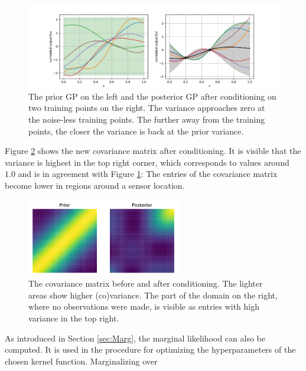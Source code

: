 \documentclass[%
  a4paper,oneside,%
  11pt,%
  smallchapters,
  style=printdev,
  extramargin,
  green,%
  rgb, <cmyk>
  ]{tubsbook}
\begin{document}
\begin{figure}[!ht]
\begin{center}

\includegraphics[width=1.1\textwidth]{pics/GPExpl}
\caption{The prior GP on the left and the posterior GP after conditioning on two training points on the right. The variance approaches zero at the noise-less training points. The further away from the training points, the closer the variance is back at the prior variance.}
\label{fig:GPExpl}

\end{center}
\end{figure}

Figure \ref{fig:CovPOst} shows the new covariance matrix after conditioning. It is visible that the variance is highest in the top right corner, which corresponds to values around $1.0$ and is in agreement with Figure \ref{fig:GPExpl}: The entries of the covariance matrix become lower in regions around a sensor location.

\begin{figure}[!ht]
\begin{center}

\includegraphics[width=0.6\textwidth]{pics/CovPosterior}
\caption{The covariance matrix before and after conditioning. The lighter areas show higher (co)variance. The part of the domain on the right, where no observations were made, is visible as entries with high variance in the top right.}
\label{fig:CovPOst}

\end{center}
\end{figure}

As introduced in Section \ref{sec:Marg}, the marginal likelihood can also be computed. It is used in the procedure for optimizing the hyperparameters of the chosen kernel function. Marginalizing over 
\end{document}
